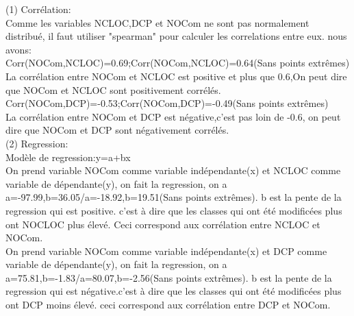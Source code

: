 \documentclass{article}
\begin{document}
{\begin{flushleft}
(1) Corrélation:\\
Comme les variables NCLOC,DCP et NOCom ne sont pas normalement distribué, il faut utiliser "spearman" pour calculer les correlations entre eux. nous avons:\\
Corr(NOCom,NCLOC)=0.69;Corr(NOCom,NCLOC)=0.64(Sans points extrêmes)\\
La corrélation entre NOCom et NCLOC est positive et plus que 0.6,On peut dire que NOCom et NCLOC sont positivement corrélés.\\
Corr(NOCom,DCP)=-0.53;Corr(NOCom,DCP)=-0.49(Sans points extrêmes)\\
La corrélation entre NOCom et DCP est négative,c'est pas loin de -0.6, on peut dire que NOCom et DCP sont négativement corrélés.\\

(2) Regression:\\
    Modèle de regression:y=a+bx\\
On prend variable NOCom comme variable indépendante(x) et NCLOC comme variable de dépendante(y), on fait la regression, on a a=-97.99,b=36.05/a=-18.92,b=19.51(Sans points extrêmes). b est la pente de la regression qui est positive. c'est à dire que les classes qui ont été modificées plus ont NOCLOC plus élevé. Ceci correspond aux corrélation entre NCLOC et NOCom.\\
On prend variable NOCom comme variable indépendante(x) et DCP comme variable de dépendante(y), on fait la regression, on a a=75.81,b=-1.83/a=80.07,b=-2.56(Sans points extrêmes). b est la pente de la regression qui est négative.c'est à dire que les classes qui ont été modificées plus ont DCP moins élevé. ceci correspond aux corrélation entre DCP et NOCom.\\
\end{flushleft}
}
\end{document}
